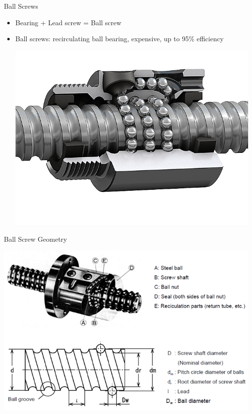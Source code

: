\documentclass[10pt, svgnames]{beamer}
\begin{document}
\begin{frame}[label={sec:orgaa837a8}]{Ball Screws}
\begin{itemize}
\item Bearing + Lead screw = Ball screw

\item Ball screws: recirculating ball bearing, expensive, up to 95\%
efficiency

\begin{center}
\includegraphics[width=.9\linewidth]{pictures/ball-screw.png}
\end{center}
\end{itemize}
\end{frame}

\begin{frame}[label={sec:org60e9012}]{Ball Screw Geometry}
\begin{center}
\includegraphics[width=.9\linewidth]{pictures/ball-screw-geometry.png}
\end{center}
\end{frame}
\end{document}
